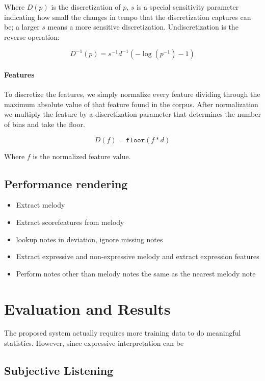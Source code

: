 \documentclass[a4paper,10pt]{article}
\begin{document}
Where $D(p)$ is the discretization of $p$, $s$ is a special sensitivity parameter indicating how small the changes in tempo that the discretization captures can be; a larger $s$ means a more sensitive discretization. Undiscretization is the reverse operation:

\begin{equation}
D^{-1}(p) = s^{-1} d^{-1}(-\log(p^{-1}) - 1)
\end{equation}

\paragraph*{Features}

To discretize the features, we simply normalize every feature dividing through the maximum absolute value of that feature found in the corpus. After normalization we multiply the feature by a discretization parameter that determines the number of bins and take the floor.

\begin{equation}
D(f) = \texttt{floor}(f*d)
\end{equation}

Where $f$ is the normalized feature value.


\subsection{Performance rendering}
\begin{itemize}
\item Extract melody
\item Extract scorefeatures from melody
\item lookup notes in deviation, ignore missing notes
\item Extract expressive and non-expressive melody and extract expression features
\item Perform notes other than melody notes the same as the nearest melody note
\end{itemize}

\section{Evaluation and Results}
The proposed system actually requires more training data to do meaningful statistics. However, since expressive interpretation can be 
\subsection{Subjective Listening}
\end{document}
